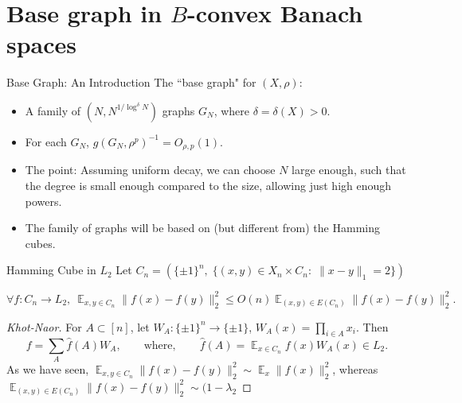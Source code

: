 \documentclass[compress]{beamer}
\DeclareMathOperator*{\Avg}{\mathbb{E}}
\begin{document}
\section{Base graph in $B$-convex Banach spaces}

\begin{frame}{Base Graph: An Introduction}
The ``base graph" for $(X,\rho)$:
\begin{itemize}
\item A family of $(N,N^{1/ \log^{\delta}N})$ graphs $G_N$, where $\delta=\delta(X)>0$. 
\item For each $G_N$, $g(G_N,\rho^p)^{-1}=O_{\rho,p}(1)$.
\item The point: Assuming uniform decay, we can choose $N$ large enough, such that the degree is small enough compared to the size, allowing just high enough powers.
\item The family of graphs will be based on (but different from) the Hamming cubes.
\end{itemize}
\end{frame}


\begin{frame}{Hamming Cube in $L_2$}
Let $C_n=(\{\pm 1\}^n,\; \{(x,y)\in X_n\times C_n:\; \|x-y\|_1=2\})$

\begin{theorem}[Enflo]
\[ \forall f:C_n \to L_2,\  \Avg_{x,y\in C_n}\|f(x)-f(y)\|_2^2 \le O({n}) \!\!\Avg_{(x,y)\in E(C_n)} \!\! \|f(x)- f(y)\|_2^2 .\]
\end{theorem}
\begin{proof}[Khot-Naor]
For $A\subset [n]$, let $W_A:\{\pm 1\}^n \to \{\pm 1\}$, $W_A(x)=\prod_{i\in A} x_i$.
Then
\[ f=\sum_A \hat f(A) W_A, \qquad \text{where}, \qquad \hat f(A)= \Avg_{x\in C_n} f(x) W_A(x)  \in L_2. \]
As we have seen, $\Avg_{x,y\in C_n}\|f(x)-f(y)\|_2^2\sim \Avg_x \|f(x)\|_2^2$, whereas
\( \Avg_{(x,y)\in E(C_n)} \!\!\! \|f(x)- f(y)\|_2^2\sim (1-\lambda_2 \)
\end{proof}
\end{frame}
\end{document}
